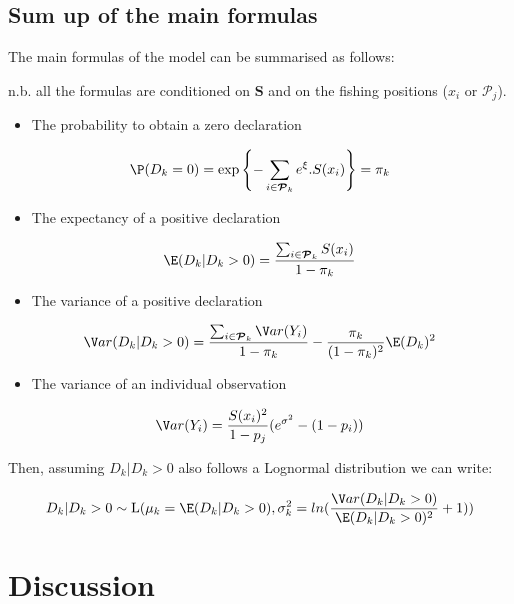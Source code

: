 \newpage
\section{Sum up of the main formulas}

The main formulas of the model can be summarised as follows:

\footnotesize
n.b. all the formulas are conditioned on \(\bm{S}\) and on the fishing positions (\(x_i\) or \(\boldsymbol{\mathcal{P}}_j\)).
\normalsize

\begin{itemize}
\item
  The probability to obtain a zero declaration
\end{itemize}

\[\P(D_k = 0) = \exp{ \left \lbrace- \sum_{i \in \boldsymbol{\mathcal{P}}_k} e^{\xi}. S(x_{i})\right \rbrace} = \pi_k\]

\begin{itemize}
\item
  The expectancy of a positive declaration
\end{itemize}

\[\E(D_k \vert D_k > 0)=\frac{\sum_{i \in \boldsymbol{\mathcal{P}}_k} S(x_{i})}{1-\pi_k}\]

\begin{itemize}
\item
  The variance of a positive declaration
\end{itemize}

\[\V ar(D_k \vert D_k > 0) = \frac{\sum_{i \in \boldsymbol{\mathcal{P}}_k} \V ar(Y_{i})}{1-\pi_k} - \frac{\pi_k}{(1-\pi_k)^2}\E(D_k)^2\]

\begin{itemize}
\item
  The variance of an individual observation
\end{itemize}

\[\V ar(Y_{i})=\frac{S(x_{i})^2}{1-p_{j}}(e^{\sigma^2}-(1-p_{i}))\]

Then, assuming \(D_k \vert D_k > 0\) also follows a Lognormal distribution we can write:

\[D_k \vert D_k > 0 \sim \operatorname{L}( \mu_k = \E(D_k \vert D_k > 0), \sigma_k^2= ln(\frac{\V ar(D_k \vert D_k > 0)}{\E(D_k \vert D_k > 0)^2} + 1))\]



\chapter{Discussion}

